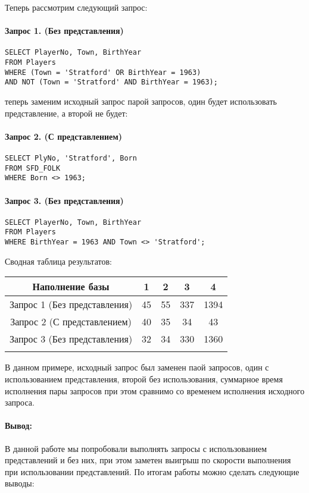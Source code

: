 \documentclass[a4paper,12pt]{article}
\begin{document}
Теперь рассмотрим следующий запрос:

\paragraph{Запрос 1. (Без представления)}
\begin{lstlisting}
SELECT PlayerNo, Town, BirthYear
FROM Players
WHERE (Town = 'Stratford' OR BirthYear = 1963)
AND NOT (Town = 'Stratford' AND BirthYear = 1963);
\end{lstlisting}

теперь заменим исходный запрос парой запросов, один будет использовать представление, а второй не будет:

\paragraph{Запрос 2. (С представлением)}
\begin{lstlisting}
SELECT PlyNo, 'Stratford', Born
FROM SFD_FOLK
WHERE Born <> 1963;
\end{lstlisting}

\paragraph{Запрос 3. (Без представления)}
\begin{lstlisting}
SELECT PlayerNo, Town, BirthYear
FROM Players
WHERE BirthYear = 1963 AND Town <> 'Stratford';
\end{lstlisting}

Сводная таблица результатов:

\begin{tabular}[t]{|c|c|c|c|c|}
\hline
Наполнение базы &    1 &    2 &    3 &    4 \\
\hline
Запрос 1 (Без представления)        &   45 &   55 &  337 & 1394 \\
\hline
Запрос 2 (С представлением)        &   40 &   35 &   34 &   43 \\
\hline
Запрос 3 (Без представления)        &   32 &   34 &  330 & 1360 \\
\hline
\caption{Сводная таблица 3}
\end{tabular}

В данном примере, исходный запрос был заменен паой запросов, один с использованием представления, второй без использования, суммарное время исполнения пары запросов при этом сравнимо со временем исполнения исходного запроса.

\paragraph{Вывод:} В данной работе мы попробовали выполнять запросы с использованием представлений и без них, при этом заметен выигрыш
по скорости выполнения при использовании представлений. По итогам работы можно сделать следующие выводы:
\end{document}
